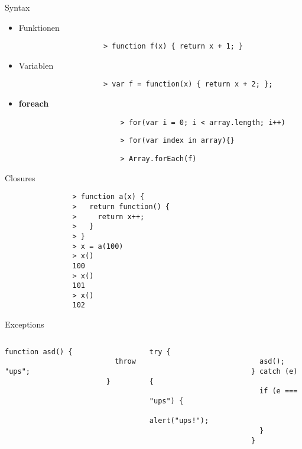 \documentclass{beamer}
\begin{document}
		\begin{frame}[fragile,shrink=5]{Syntax}
			\begin{itemize}
				\item Funktionen
				\begin{lstlisting}
					> function f(x) { return x + 1; }
				\end{lstlisting}
				\item Variablen
				\begin{lstlisting}
					> var f = function(x) { return x + 2; };
				\end{lstlisting}
				\item \textbf{foreach}
					\begin{lstlisting}
						> for(var i = 0; i < array.length; i++)
					\end{lstlisting}
					\begin{lstlisting}
						> for(var index in array){}
					\end{lstlisting}
					\begin{lstlisting}
						> Array.forEach(f)
					\end{lstlisting}
			\end{itemize}
		\end{frame}
		
		\begin{frame}[fragile,shrink=5]{Closures}
			\begin{lstlisting}
				> function a(x) {
				>   return function() {
				>     return x++;
				>   }
				> }
				> x = a(100)
				> x()
				100
				> x()
				101
				> x()
				102
			\end{lstlisting}
		\end{frame}
		
		\begin{frame}[fragile,shrink=5]{Exceptions}
			\begin{columns}
					\begin{lstlisting}[title={}]
						function asd() {
						  throw "ups";
						}
					\end{lstlisting}
				
					\begin{lstlisting}[title={}]
						try {
						  asd();
						} catch (e) {
						  if (e === "ups") {
						    alert("ups!");
						  }
						}
					\end{lstlisting}
			\end{columns}
		\end{frame}
		
\end{document}

